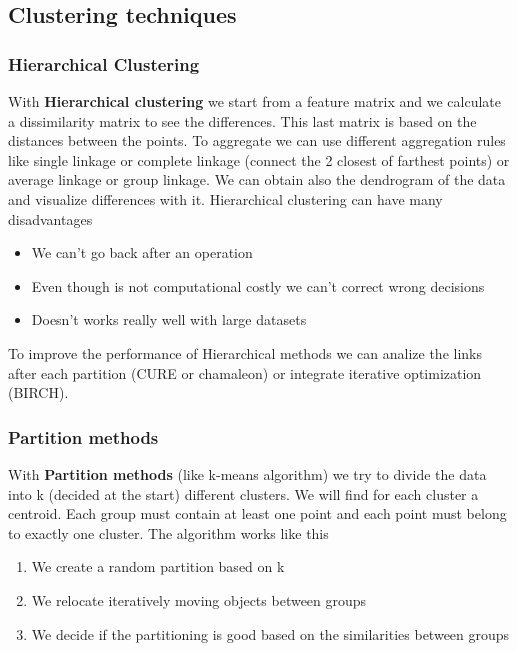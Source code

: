 \subsection{Clustering techniques}

\subsubsection{Hierarchical Clustering}

With \textbf{Hierarchical clustering} we start from a feature matrix and we calculate a dissimilarity matrix to see the differences. This last matrix is based on the distances between the points.
To aggregate we can use different aggregation rules like single linkage or complete linkage (connect the 2 closest of farthest points) or average linkage or group linkage.
We can obtain also the dendrogram of the data and visualize differences with it.
Hierarchical clustering can have many disadvantages

\begin{itemize}
    \item We can't go back after an operation
    \item Even though is not computational costly we can't correct wrong decisions
    \item Doesn't works really well with large datasets
\end{itemize}

To improve the performance of Hierarchical methods we can analize the links after each partition (CURE or chamaleon) or integrate iterative optimization (BIRCH).

\vspace{10pt}

\subsubsection{Partition methods}

With \textbf{Partition methods} (like k-means algorithm) we try to divide the data into k (decided at the start) different clusters. We will find for each cluster a centroid.
Each group must contain at least one point and each point must belong to exactly one cluster. The algorithm works like this

\begin{enumerate}
    \item We create a random partition based on k
    \item We relocate iteratively moving objects between groups
    \item We decide if the partitioning is good based on the similarities between groups
\end{enumerate}

